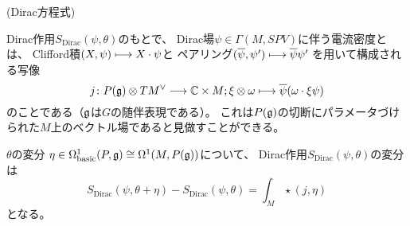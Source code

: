 \begin{thm}
(Dirac方程式)
\end{thm}

\begin{dfn}
  Dirac作用$S_{\mathrm{Dirac}}(\psi,\theta)$のもとで、
  Dirac場$\psi\in\Gamma(M,SPV)$に伴う電流密度とは、
  Clifford積$(X,\psi)\longmapsto X\cdot\psi$と
  ペアリング$(\overline{\psi},\psi')\longmapsto\overline{\psi}\psi'$
  を用いて構成される写像
  \begin{equation}
    j \colon P(\mathfrak{g}) \otimes TM^\vee \longrightarrow \mathbb{C}\times M;
    \xi \otimes \omega \longmapsto \overline{\psi}(\omega\cdot\xi\psi)
  \end{equation}
  のことである（$\mathfrak{g}$は$G$の随伴表現である）。
  これは$P(\mathfrak{g})$の切断にパラメータづけられた$M$上のベクトル場であると見做すことができる。
\end{dfn}

\begin{thm}
  $\theta$の変分
  $\eta \in \Omega^1_{\mathrm{basic}}(P, \mathfrak{g})\cong
  \Omega^1(M, P(\mathfrak{g}))$について、
  Dirac作用$S_{\mathrm{Dirac}}(\psi,\theta)$の変分は
  \begin{equation}
    S_{\mathrm{Dirac}}(\psi,\theta+\eta)-S_{\mathrm{Dirac}}(\psi,\theta)
    = \int_M \star (j, \eta)
  \end{equation}
  となる。
\end{thm}
